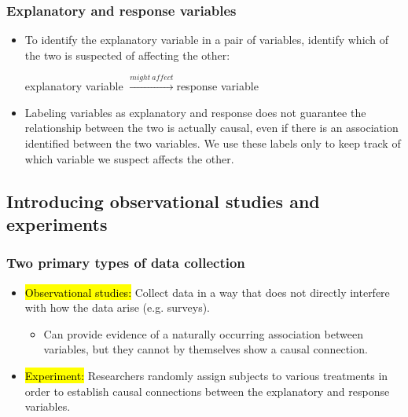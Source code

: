 \documentclass[slidestop,compress,mathserif]{beamer}
\begin{document}
\begin{frame}
\frametitle{Explanatory and response variables}

\begin{itemize}

\item To identify the explanatory variable in a pair of variables, identify which of the two is suspected of affecting the other:

\begin{center}
explanatory variable $\xrightarrow{might~affect}$response variable
\end{center}

\item Labeling variables as explanatory and response does not guarantee the relationship between the two is actually causal, even if there is an association identified between the two variables. We use these labels only to keep track of which variable we suspect affects the other.

\end{itemize}

\end{frame}


\subsection{Introducing observational studies and experiments}


\begin{frame}
\frametitle{Two primary types of data collection}

\begin{itemize}

\item \hl{Observational studies:} Collect data in a way that does not directly interfere with how the data arise (e.g. surveys).
\begin{itemize}
\item Can provide evidence of a naturally occurring association between variables, but they cannot by themselves show a causal connection.
\end{itemize}

\pause

\item \hl{Experiment:} Researchers randomly assign subjects to various treatments in order to establish causal connections between the explanatory and response variables.


\end{itemize}

\end{frame}
\end{document}
